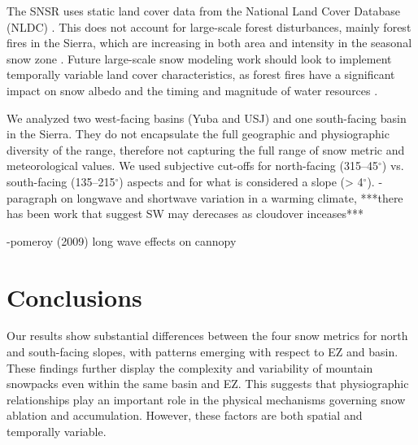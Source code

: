 The SNSR uses static land cover data from the National Land Cover Database (NLDC) \citep{homerConterminousUnitedStates2020}. This does not account for large-scale forest disturbances, mainly forest fires in the Sierra, which are increasing in both area and intensity in the seasonal snow zone \cite{koshkinWildfireImpactsWestern2022}. Future large-scale snow modeling work should look to implement temporally variable land cover characteristics, as forest fires have a significant impact on snow albedo \cite{gleasonCharredForestsIncrease2013} and the timing and magnitude of water resources \citep{williamsGrowingImpactWildfire2022}.

We analyzed two west-facing basins (Yuba and USJ) and one south-facing basin in the Sierra. They do not encapsulate the full geographic and physiographic diversity of the range, therefore not capturing the full range of snow metric and meteorological values. We used subjective cut-offs for north-facing (315--45$^{\circ}$) vs. south-facing (135--215$^{\circ}$) aspects and for what is considered a slope (> 4$^{\circ}$).
% 
-paragraph on longwave and shortwave variation in a warming climate, ***there has been work that suggest SW may derecases as cloudover inceases***

-pomeroy (2009) long wave effects on cannopy

\hypertarget{ch2-conclusions}{\section{Conclusions}\label{ch2-conclusions}}

Our results show substantial differences between the four snow metrics for north and south-facing slopes, with patterns emerging with respect to EZ and basin. These findings further display the complexity and variability of mountain snowpacks even within the same basin and EZ. This suggests that physiographic relationships play an important role in the physical mechanisms governing snow ablation and accumulation. However, these factors are both spatial and temporally variable. 

\clearpage


